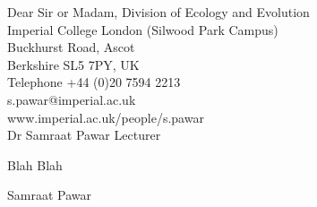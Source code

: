 \documentclass[blank]{impletter}
\begin{document}
{
Dear Sir or Madam,
}
{ Division of Ecology and Evolution\\
Imperial College London (Silwood Park Campus)\\
Buckhurst Road, Ascot\\
Berkshire SL5 7PY, UK\\
Telephone +44 (0)20 7594 2213\\
s.pawar@imperial.ac.uk\\
www.imperial.ac.uk/people/s.pawar\\
}
{
Dr Samraat Pawar
}
{
Lecturer\\
}
\informal

Blah Blah

{
Samraat Pawar
}
\end{document}

